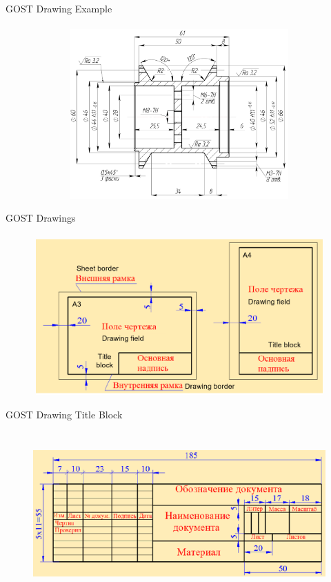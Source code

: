 \documentclass[aspectratio=169]{beamer}
\begin{document}
\begin{frame}[t]{GOST Drawing Example}
    \framesubtitle{}
    \vspace{-0.6cm}
    \begin{figure}[H]
        \centering\includegraphics[height=6.5cm,width=1\textwidth,keepaspectratio]{resources/example_gost.png}
        \label{fig:resources/example_gost.png}
    \end{figure}
\end{frame}

\begin{frame}[t]{GOST Drawings}
    \framesubtitle{}
    \vspace{-0.6cm}
    \begin{figure}[H]
        \centering\includegraphics[height=6cm,width=1\textwidth,keepaspectratio]{resources/title_block.png}
        \label{fig:resources/title_block.png}
    \end{figure}
\end{frame}

\begin{frame}[t]{GOST Drawing Title Block}
    \framesubtitle{}
    \vspace{-0.6cm}
    \begin{figure}[H]
        \centering\includegraphics[height=6cm,width=1\textwidth,keepaspectratio]{resources/title.png}
        \label{fig:resources/title.png}
    \end{figure}
\end{frame}
\end{document}
